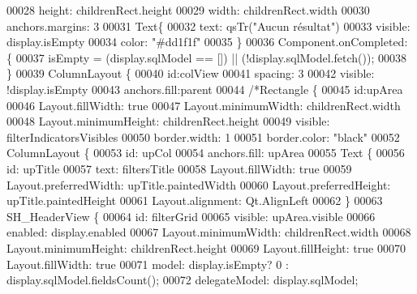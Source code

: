 \begin{DoxyCode}
00028     height: childrenRect.height
00029     width: childrenRect.width
00030     anchors.margins: 3
00031     Text\{
00032         text: qsTr(\textcolor{stringliteral}{"Aucun résultat"})
00033         visible: display.isEmpty
00034         color: \textcolor{stringliteral}{"#dd1f1f"}
00035     \}
00036     Component.onCompleted: \{
00037         isEmpty = (display.sqlModel == []) || (!display.sqlModel.fetch());
00038     \}
00039     ColumnLayout \{
00040         \textcolor{keywordtype}{id}:colView
00041         spacing: 3
00042         visible: !display.isEmpty
00043         anchors.fill:parent
00044         \textcolor{comment}{/*Rectangle \{}
00045 \textcolor{comment}{            id:upArea}
00046 \textcolor{comment}{            Layout.fillWidth: true}
00047 \textcolor{comment}{            Layout.minimumWidth: childrenRect.width}
00048 \textcolor{comment}{            Layout.minimumHeight: childrenRect.height}
00049 \textcolor{comment}{            visible: filterIndicatorsVisibles}
00050 \textcolor{comment}{            border.width: 1}
00051 \textcolor{comment}{            border.color: "black"}
00052 \textcolor{comment}{            ColumnLayout \{}
00053 \textcolor{comment}{                id: upCol}
00054 \textcolor{comment}{                anchors.fill: upArea}
00055 \textcolor{comment}{                Text \{}
00056 \textcolor{comment}{                    id: upTitle}
00057 \textcolor{comment}{                    text: filtersTitle}
00058 \textcolor{comment}{                    Layout.fillWidth: true}
00059 \textcolor{comment}{                    Layout.preferredWidth: upTitle.paintedWidth}
00060 \textcolor{comment}{                    Layout.preferredHeight: upTitle.paintedHeight}
00061 \textcolor{comment}{                    Layout.alignment: Qt.AlignLeft}
00062 \textcolor{comment}{                \}}
00063 \textcolor{comment}{                SH\_HeaderView \{}
00064 \textcolor{comment}{                    id: filterGrid}
00065 \textcolor{comment}{                    visible: upArea.visible}
00066 \textcolor{comment}{                    enabled: display.enabled}
00067 \textcolor{comment}{                    Layout.minimumWidth: childrenRect.width}
00068 \textcolor{comment}{                    Layout.minimumHeight: childrenRect.height}
00069 \textcolor{comment}{                    Layout.fillHeight: true}
00070 \textcolor{comment}{                    Layout.fillWidth: true}
00071 \textcolor{comment}{                    model: display.isEmpty? 0 : display.sqlModel.fieldsCount();}
00072 \textcolor{comment}{                    delegateModel: display.sqlModel;}

\end{DoxyCode}
